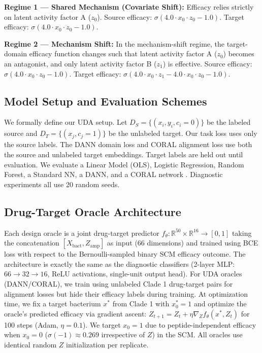 \documentclass{article}
\begin{document}
\textbf{Regime 1 --- Shared Mechanism (Covariate Shift):} Efficacy relies strictly on latent activity factor A ($z_0$). Source efficacy: $\sigma(4.0 \cdot x_0 \cdot z_0 - 1.0)$. Target efficacy: $\sigma(4.0 \cdot x_0 \cdot z_0 - 1.0)$.

\textbf{Regime 2 --- Mechanism Shift:} In the mechanism-shift regime, the target-domain efficacy function changes such that latent activity factor A ($z_0$) becomes an antagonist, and only latent activity factor B ($z_1$) is effective. Source efficacy: $\sigma(4.0 \cdot x_0 \cdot z_0 - 1.0)$. Target efficacy: $\sigma(4.0 \cdot x_0 \cdot z_1 - 4.0 \cdot x_0 \cdot z_0 - 1.0)$.

\subsection{Model Setup and Evaluation Schemes}
We formally define our UDA setup. Let $D_S = \{(x_i, y_i, c_i{=}0)\}$ be the labeled source and $D_T = \{(x_j, c_j{=}1)\}$ be the unlabeled target. Our task loss uses only the source labels. The DANN domain loss and CORAL alignment loss use both the source and unlabeled target embeddings. Target labels are held out until evaluation. We evaluate a Linear Model (OLS), Logistic Regression, Random Forest, a Standard NN, a DANN, and a CORAL network \cite{sun2016deep}. Diagnostic experiments all use 20 random seeds.

\subsection{Drug-Target Oracle Architecture}
Each design oracle is a joint drug-target predictor $f_\theta: \mathbb{R}^{50} \times \mathbb{R}^{16} \to [0,1]$ taking the concatenation $[X_{\text{bact}}, Z_{\text{amp}}]$ as input (66 dimensions) and trained using BCE loss with respect to the Bernoulli-sampled binary SCM efficacy outcome. The architecture is exactly the same as the diagnostic classifiers (2-layer MLP: $66 \to 32 \to 16$, ReLU activations, single-unit output head). For UDA oracles (DANN/CORAL), we train using unlabeled Clade 1 drug-target pairs for alignment losses but hide their efficacy labels during training. At optimization time, we fix a target bacterium $x^*$ from Clade 1 with $x_0^* = 1$ and optimize the oracle's predicted efficacy via gradient ascent: $Z_{t+1} = Z_t + \eta \nabla_Z f_\theta(x^*, Z_t)$ for 100 steps (Adam, $\eta = 0.1$). We target $x_0{=}1$ due to peptide-independent efficacy when $x_0{=}0$ ($\sigma(-1) \approx 0.269$ irrespective of $Z$) in the SCM. All oracles use identical random $Z$ initialization per replicate.
\end{document}
